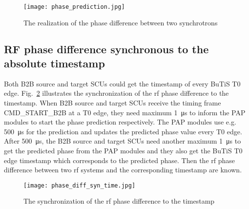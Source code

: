 \begin{figure}[!htb]
   \centering   
   \texttt{[image: phase\_prediction.jpg]}
   \caption{The realization of the phase difference between two synchrotrons}
   \label{phase_prediction}
\end{figure}

\subsection{RF phase difference synchronous to the absolute timestamp}
Both B2B source and target SCUs could get the timestamp of every BuTiS T0 edge. Fig.~\ref{phase_diff_syn_time} illustrates the synchronization of the rf phase difference to the timestamp. When B2B source and target SCUs receive the timing frame CMD\_START\_B2B at a T0 edge, they need maximum \SI{1}{\us} to inform the PAP modules to start the phase prediction respectively. The PAP modules use e.g. \SI{500}{\us} for the prediction and updates the predicted phase value every T0 edge. After \SI{500}{\us}, the B2B source and target SCUs need another maximum \SI{1}{\us} to get the predicted phase from the PAP modules and they also get the BuTiS T0 edge timestamp which corresponds to the predicted phase. Then the rf phase difference between two rf systems and the corresponding timestamp are known. 
 \begin{figure}[!htb]
   \centering   
   \texttt{[image: phase\_diff\_syn\_time.jpg]}
   \caption{The synchronization of the rf phase difference to the timestamp}
   \label{phase_diff_syn_time}
\end{figure}
